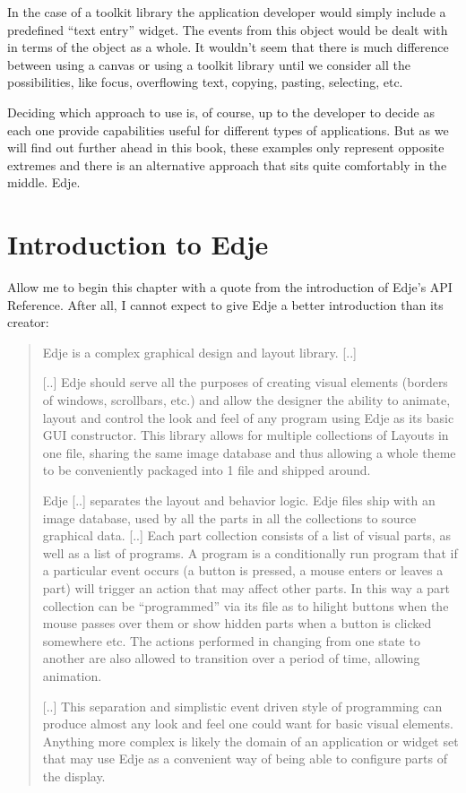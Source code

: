 \documentclass[12pt,a4paper,english]{book}
\begin{document}
In the case of a toolkit library the application developer would simply include
a predefined ``text entry'' widget. The events from this object would be dealt
with in terms of the object as a whole. It wouldn't seem that there is much
difference between using a canvas or using a toolkit library until we consider
all the possibilities, like focus, overflowing text, copying, pasting,
selecting, etc.

Deciding which approach to use is, of course, up to the developer to decide as
each one provide capabilities useful for different types of applications. But
as we will find out further ahead in this book, these examples only represent
opposite extremes and there is an alternative approach that sits quite
comfortably in the middle. Edje.



\hypertarget{introduction-to-edje}{}
\section{Introduction to Edje}

Allow me to begin this chapter with a quote from the introduction of Edje's API
Reference. After all, I cannot expect to give Edje a better introduction than
its creator:
\begin{quote}

Edje is a complex graphical design and layout library. {[}..{]}

{[}..{]} Edje should serve all the purposes of creating visual elements
(borders of windows, scrollbars, etc.) and allow the designer the ability
to animate, layout and control the look and feel of any program using Edje
as its basic GUI constructor. This library allows for multiple collections
of Layouts in one file, sharing the same image database and thus allowing a
whole theme to be conveniently packaged into 1 file and shipped around.

Edje {[}..{]} separates the layout and behavior logic. Edje files ship with an
image database, used by all the parts in all the collections to source
graphical data. {[}..{]} Each part collection consists of a list of visual
parts, as well as a list of programs. A program is a conditionally run
program that if a particular event occurs (a button is pressed, a mouse
enters or leaves a part) will trigger an action that may affect other
parts. In this way a part collection can be ``programmed'' via its file as to
hilight buttons when the mouse passes over them or show hidden parts when a
button is clicked somewhere etc. The actions performed in changing from one
state to another are also allowed to transition over a period of time,
allowing animation.

{[}..{]} This separation and simplistic event driven style of programming can
produce almost any look and feel one could want for basic visual elements.
Anything more complex is likely the domain of an application or widget set
that may use Edje as a convenient way of being able to configure parts of
the display.
\end{quote}
\end{document}
